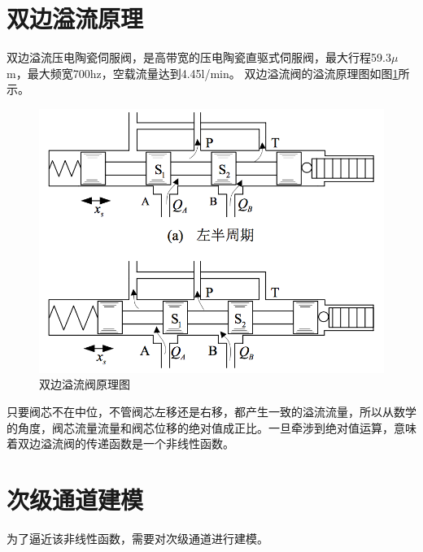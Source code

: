 \documentclass[12pt]{article}
\begin{document}
\section{双边溢流原理}
双边溢流压电陶瓷伺服阀，是高带宽的压电陶瓷直驱式伺服阀，最大行程59.3$\mu$m，最大频宽700hz，空载流量达到4.45l/min。
双边溢流阀的溢流原理图如图\ref{fig:fig4}所示。

\begin{figure}[H]
\begin{center}
\includegraphics[width=0.9\linewidth]{./images/双边溢流阀原理图.png}
\caption{双边溢流阀原理图}
\label{fig:fig4}
\end{center}
\end{figure}

只要阀芯不在中位，不管阀芯左移还是右移，都产生一致的溢流流量，所以从数学的角度，阀芯流量流量和阀芯位移的绝对值成正比。一旦牵涉到绝对值运算，意味着双边溢流阀的传递函数是一个非线性函数。

\section{次级通道建模}
为了逼近该非线性函数，需要对次级通道进行建模。
\end{document}
